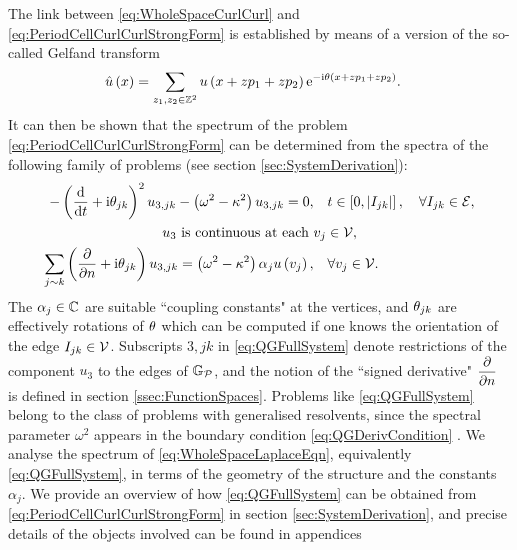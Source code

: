 The link between \eqref{eq:WholeSpaceCurlCurl} and \eqref{eq:PeriodCellCurlCurlStrongForm} is established by means of a version of the so-called Gelfand transform \cite{gelfand1950expansion}
\begin{align*}
	\hat{u}\left( x \right) &= \sum_{z_1,z_2\in\mathbb{Z}^2}u\left( x+zp_1+zp_2 \right)\mathrm{e}^{-\mathrm{i}\theta\left( x+zp_1+zp_2 \right)}.
\end{align*}
It can then be shown that the spectrum of the problem \eqref{eq:PeriodCellCurlCurlStrongForm} can be determined from the spectra of the following family of problems (see section \ref{sec:SystemDerivation}):
\begin{subequations} \label{eq:3DQGFullSystem}
	\begin{align}
		- \left(  \dfrac{\mathrm{d}}{\mathrm{d}t} + \mathrm{i}\theta_{jk}  \right)^2 u_{3,jk} - \left( \omega^2-\kappa^2 \right)u_{3,jk} = 0, &\quad t\in\left[ 0,\left\lvert I_{jk} \right\rvert \right], \quad\forall I_{jk}\in\mathcal{E}, \\
		u_3 \text{ is continuous at each } & v_j\in\mathcal{V}, \\
		\sum_{j\sim k}\left(  \dfrac{\partial }{\partial n} + \mathrm{i}\theta_{jk}  \right)u_{3,jk} = \left( \omega^2-\kappa^2 \right)\alpha_j u\left( v_j \right), &\quad\forall v_j\in\mathcal{V}.
	\end{align}
\end{subequations}
The $\alpha_j\in\mathbb{C}$ are suitable ``coupling constants" at the vertices, and $\theta_{jk}$ are effectively rotations of $\theta$ which can be computed if one knows the orientation of the edge $I_{jk}\in\mathcal{V}$.
Subscripts $3,jk$ in \eqref{eq:QGFullSystem} denote restrictions of the component $u_3$ to the edges of $\mathbb{G}_{\mathcal{P}}$, and the notion of the ``signed derivative" $\dfrac{\partial }{\partial n}$ is defined in section \ref{ssec:FunctionSpaces}.
Problems like \eqref{eq:QGFullSystem} belong to the class of problems with generalised resolvents, since the spectral parameter $\omega^2$ appears in the boundary condition \eqref{eq:QGDerivCondition} \cite{strauss1954generalized, strauss1968extensions, strauss1998functional, cherednichenko2018effective}.
We analyse the spectrum of \eqref{eq:WholeSpaceLaplaceEqn}, equivalently \eqref{eq:QGFullSystem}, in terms of the geometry of the structure and the constants $\alpha_j$.
We provide an overview of how \eqref{eq:QGFullSystem} can be obtained from \eqref{eq:PeriodCellCurlCurlStrongForm} in section \ref{sec:SystemDerivation}, and precise details of the objects involved can be found in appendices 
